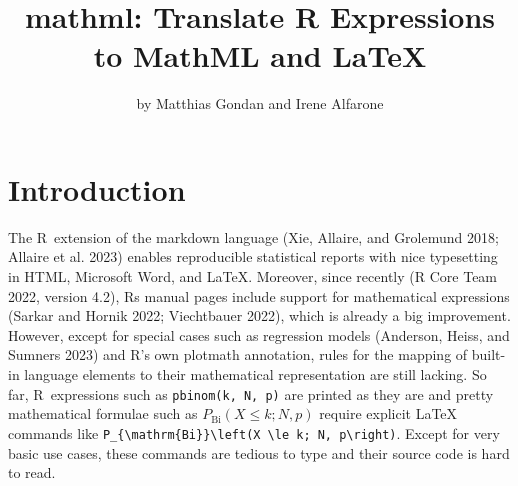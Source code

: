 \title{mathml: Translate R Expressions to MathML and LaTeX}


\author{by Matthias Gondan and Irene Alfarone}

\maketitle


\hypertarget{introduction}{%
\section{Introduction}\label{introduction}}

The R~extension of the markdown language (Xie, Allaire, and Grolemund 2018; Allaire et al. 2023)
enables reproducible statistical reports with
nice typesetting in HTML, Microsoft Word, and LaTeX. Moreover, since
recently (R Core Team 2022, version 4.2), Rs manual pages include
support for mathematical expressions (Sarkar and Hornik 2022; Viechtbauer 2022),
which is already a big improvement. However, except
for special cases such as regression models (Anderson, Heiss, and Sumners 2023)
and R's own plotmath annotation, rules for the mapping of
built-in language elements to their mathematical representation are
still lacking. So far, R~expressions such as \texttt{pbinom(k,~N,~p)} are
printed as they are and pretty mathematical formulae such as
\(P_{\mathrm{Bi}}(X \le k; N, p)\) require explicit LaTeX commands like
\texttt{P\_\{\textbackslash{}mathrm\{Bi\}\}\textbackslash{}left(X~\textbackslash{}le~k;~N,~p\textbackslash{}right)}. Except for very basic use
cases, these commands are tedious to type and their source code is hard
to read.

